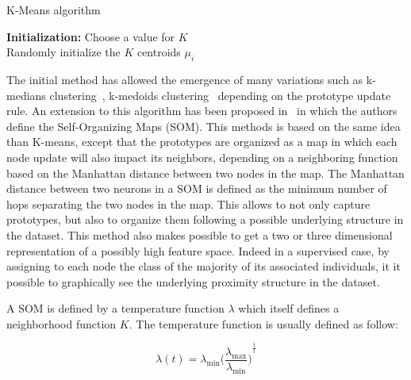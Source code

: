     \begin{algorithm}
        \caption{K-Means algorithm}
\label{alg:kmeans}
        \textbf{Initialization:} Choose a value for $K$\\
        Randomly initialize the $K$ centroids $\mu_i$\\
    \end{algorithm}

 The initial method has allowed the emergence of many variations such as k-medians clustering~\cite{jain1988algorithms}, k-medoids clustering~\cite{kaufman1987clustering} depending on the prototype update rule. An extension to this algorithm has been proposed in~\cite{kohonen1998self} in which the authors define the Self-Organizing Maps (SOM). This methods is based on the same idea than K-means, except that the prototypes are organized as a map in which each node update will also impact its neighbors, depending on a neighboring function based on the Manhattan distance between two nodes in the map. The Manhattan distance between two neurons in a SOM is defined as the minimum number of hops separating the two nodes in the map. This allows to not only capture prototypes, but also to organize them following a possible underlying structure in the dataset. This method also makes possible to get a two or three dimensional representation of a possibly high feature space. Indeed in a supervised case, by assigning to each node the class of the majority of its associated individuals, it it possible to graphically see the underlying proximity structure in the dataset. 

A SOM is defined by a temperature function $\lambda$ which itself defines a neighborhood function $K$. The temperature function is usually defined as follow:

    \begin{equation}
    \lambda(t) = \lambda_{\min}{\Big(\frac{\lambda_{\max}}{\lambda_{\min}}\Big)}^{\frac{1}{t}}
        \label{eq:som_temp}
    \end{equation}

